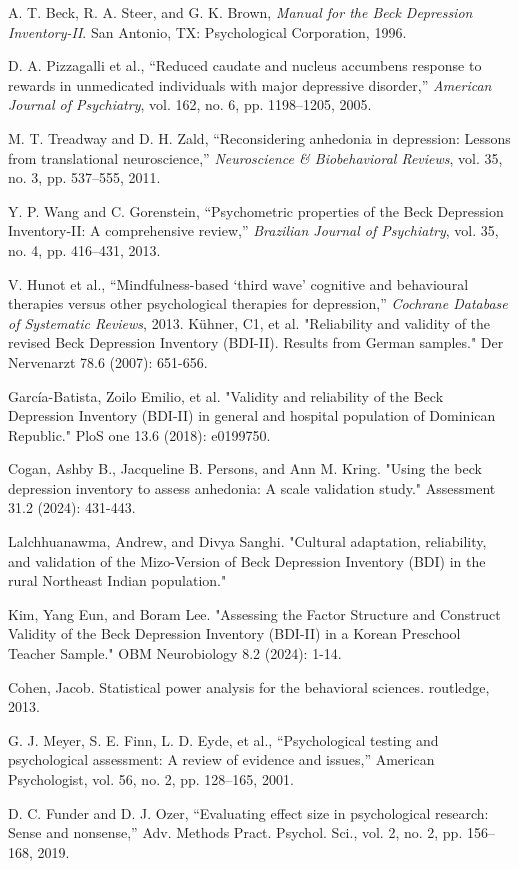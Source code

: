 \documentclass[conference]{IEEEtran}
\begin{document}
\begin{thebibliography}{00}

 A. T. Beck, R. A. Steer, and G. K. Brown, \textit{Manual for the Beck Depression Inventory-II}. San Antonio, TX: Psychological Corporation, 1996.

 D. A. Pizzagalli et al., ``Reduced caudate and nucleus accumbens response to rewards in unmedicated individuals with major depressive disorder,'' \textit{American Journal of Psychiatry}, vol. 162, no. 6, pp. 1198–1205, 2005.

 M. T. Treadway and D. H. Zald, ``Reconsidering anhedonia in depression: Lessons from translational neuroscience,'' \textit{Neuroscience \& Biobehavioral Reviews}, vol. 35, no. 3, pp. 537–555, 2011.

 Y. P. Wang and C. Gorenstein, ``Psychometric properties of the Beck Depression Inventory-II: A comprehensive review,'' \textit{Brazilian Journal of Psychiatry}, vol. 35, no. 4, pp. 416–431, 2013.

 V. Hunot et al., ``Mindfulness-based `third wave' cognitive and behavioural therapies versus other psychological therapies for depression,'' \textit{Cochrane Database of Systematic Reviews}, 2013.
 Kühner, C1, et al. "Reliability and validity of the revised Beck Depression Inventory (BDI-II). Results from German samples." Der Nervenarzt 78.6 (2007): 651-656.

 García-Batista, Zoilo Emilio, et al. "Validity and reliability of the Beck Depression Inventory (BDI-II) in general and hospital population of Dominican Republic." PloS one 13.6 (2018): e0199750.

 Cogan, Ashby B., Jacqueline B. Persons, and Ann M. Kring. "Using the beck depression inventory to assess anhedonia: A scale validation study." Assessment 31.2 (2024): 431-443.

 Lalchhuanawma, Andrew, and Divya Sanghi. "Cultural adaptation, reliability, and validation of the Mizo-Version of Beck Depression Inventory (BDI) in the rural Northeast Indian population."

 Kim, Yang Eun, and Boram Lee. "Assessing the Factor Structure and Construct Validity of the Beck Depression Inventory (BDI-II) in a Korean Preschool Teacher Sample." OBM Neurobiology 8.2 (2024): 1-14.

 Cohen, Jacob. Statistical power analysis for the behavioral sciences. routledge, 2013.

 G. J. Meyer, S. E. Finn, L. D. Eyde, et al., “Psychological testing and psychological assessment: A review of evidence and issues,” American Psychologist, vol. 56, no. 2, pp. 128–165, 2001.

 D. C. Funder and D. J. Ozer, “Evaluating effect size in psychological research: Sense and nonsense,” Adv. Methods Pract. Psychol. Sci., vol. 2, no. 2, pp. 156–168, 2019.

\end{thebibliography}
\end{document}
